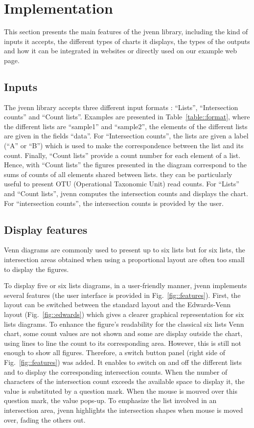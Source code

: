 \documentclass{bmcart}
\begin{document}
\section*{Implementation}

This section presents the main features of the jvenn library, including the 
kind of inputs it accepts, the different types of charts it displays, the types 
of the outputs and how it can be integrated in websites or directly used on our 
example web page.

\subsection*{Inputs}

The jvenn library accepts three different input formats : ``Lists'',
``Intersection counts'' and ``Count lists''. Examples are presented in 
Table~\ref{table::format}, where the different lists are ``sample1'' and
``sample2'', the elements of the different lists are given in the fields
``data''. For ``Intersection counts'', the lists are given a label (``A'' or 
``B'') which is used to make the correspondence between the list and its count.
Finally, ``Count lists'' provide a count number for each element of a list.
Hence, with ``Count lists'' the figures presented in the diagram correspond to
the sums of counts of all elements shared between lists. they can be
particularly useful to present OTU (Operational Taxonomic Unit) read counts. For
``Lists'' and ``Count lists'', jvenn computes the intersection counts and
displays the chart. For ``intersection counts'', the intersection counts is
provided by the user. 

\subsection*{Display features}

Venn diagrams are commonly used to present up to six lists but for six 
lists, the intersection areas obtained when using a proportional layout are 
often too small to
display the figures.

To display five or six lists diagrams, in a user-friendly manner, jvenn
implements several features (the user interface is provided in Fig.~\ref{fig::features}). 
First, the layout can be switched between the standard layout and the
Edwards-Venn layout (Fig.~\ref{fig::edwards}) which gives a clearer graphical
representation for six lists diagrams. To enhance the figure's readability for
the classical six lists Venn chart, some count values are not shown and some are
display outside the chart, using lines to line the count to its corresponding
area. However, this is still not enough to show all figures. Therefore, a switch
button panel (right side of Fig.~\ref{fig::features}) was added. It enables to
switch on and off the different lists and to display the corresponding 
intersection counts. 
When the number of characters of the intersection count exceeds the available
space to display it, the value is substituted by a question mark. When the mouse
is mouved over this question mark, the value pops-up. To emphasize the list
involved in an intersection area, jvenn highlights the intersection shapes when
mouse is moved over, fading the others out.
\end{document}

